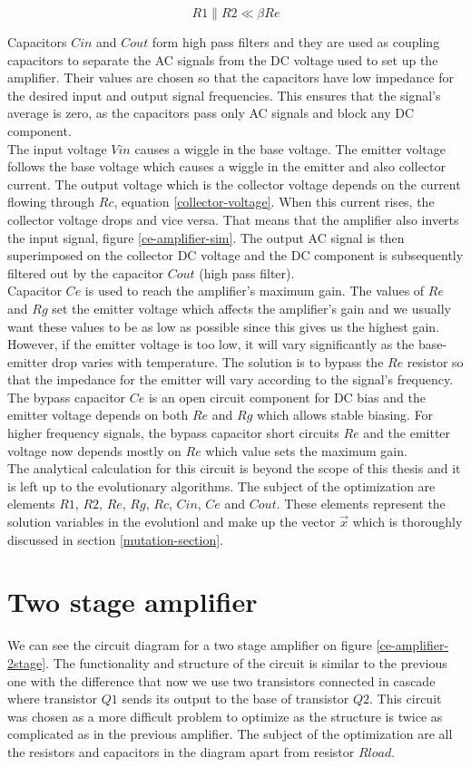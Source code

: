 \begin{equation} \label{divider-impedance}
    R1 \| R2 \ll \beta Re
\end{equation}

Capacitors $Cin$ and $Cout$ form high pass filters and they are used as coupling capacitors to separate the AC signals from the DC voltage used to set up the amplifier. Their values are chosen so that the capacitors have low impedance for the desired input and output signal frequencies. This ensures that the signal's average is zero, as the capacitors pass only AC signals and block any DC component.\\
The input voltage $Vin$ causes a wiggle in the base voltage. The emitter voltage follows the base voltage which causes a wiggle in the emitter and also collector current. The output voltage which is the collector voltage depends on the current flowing through $Rc$, equation \ref{collector-voltage}. When this current rises, the collector voltage drops and vice versa. That means that the amplifier also inverts the input signal, figure \ref{ce-amplifier-sim}. The output AC signal is then superimposed on the collector DC voltage and the DC component is subsequently filtered out by the capacitor $Cout$ (high pass filter).\\
Capacitor $Ce$ is used to reach the amplifier's maximum gain. The values of $Re$ and $Rg$ set the emitter voltage which affects the amplifier's gain and we usually want these values to be as low as possible since this gives us the highest gain. However, if the emitter voltage is too low, it will vary significantly as the base-emitter drop varies with temperature. The solution is to bypass the $Re$ resistor so that the impedance for the emitter will vary according to the signal's frequency. The bypass capacitor $Ce$ is an open circuit component for DC bias and the emitter voltage depends on both $Re$ and $Rg$ which allows stable biasing. For higher frequency signals, the bypass capacitor short circuits $Re$ and the emitter voltage now depends mostly on $Re$ which value sets the maximum gain.\\
The analytical calculation for this circuit is beyond the scope of this thesis and it is left up to the evolutionary algorithms. The subject of the optimization are elements $R1$, $R2$, $Re$, $Rg$, $Rc$, $Cin$, $Ce$ and $Cout$. These elements represent the solution variables in the evolutionl and make up the vector $\vec{x}$ which is thoroughly discussed in section \ref{mutation-section}.

\section{Two stage amplifier}
We can see the circuit diagram for a two stage amplifier on figure \ref{ce-amplifier-2stage}. The functionality and structure of the circuit is similar to the previous one with the difference that now we use two transistors connected in cascade where transistor $Q1$ sends its output to the base of transistor $Q2$. This circuit was chosen as a more difficult problem to optimize as the structure is twice as complicated as in the previous amplifier. The subject of the optimization are all the resistors and capacitors in the diagram apart from resistor $Rload$.

